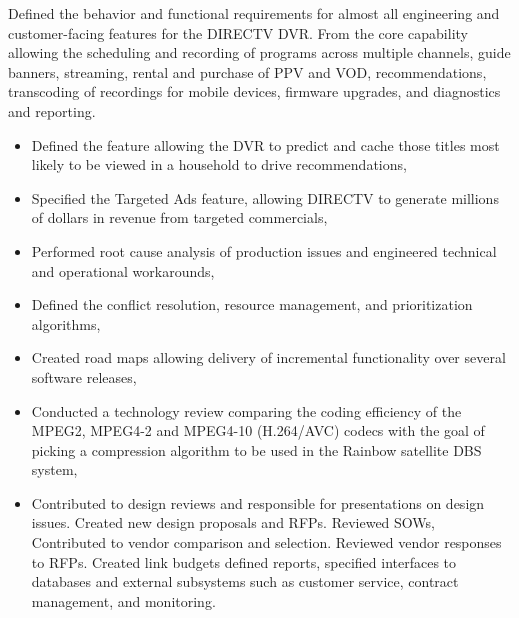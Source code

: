 
\par{ Defined the behavior and functional requirements for almost all
  engineering and customer-facing features for the DIRECTV DVR\@. From the core
  capability allowing the scheduling and recording of programs across multiple
  channels, guide banners, streaming, rental and purchase of PPV and VOD,
  recommendations, transcoding of recordings for mobile devices, firmware
  upgrades, and diagnostics and reporting. }

\begin{itemize}
  \item Defined the feature allowing the DVR to predict and cache those titles
    most likely to be viewed in a household to drive recommendations,
  \item Specified the Targeted Ads feature, allowing DIRECTV to generate
    millions of dollars in revenue from targeted commercials,
  \item Performed root cause analysis of production issues and engineered
    technical and operational workarounds,
  \item Defined the conflict resolution, resource management, and prioritization
    algorithms,
  \item Created road maps allowing delivery of incremental functionality over
    several software releases,
  \item Conducted a technology review comparing the coding efficiency of the
    MPEG2, MPEG4-2 and MPEG4-10 (H.264/AVC) codecs with the goal of picking a
    compression algorithm to be used in the Rainbow satellite DBS system,
  \item Contributed to design reviews and responsible for presentations on
    design issues. Created new design proposals and RFPs. Reviewed SOWs,
    Contributed to vendor comparison and selection. Reviewed vendor responses to
    RFPs. Created link budgets defined reports, specified interfaces to
    databases and external subsystems such as customer service, contract
    management, and monitoring.
\end{itemize}

